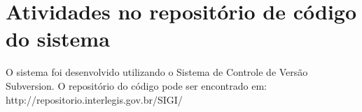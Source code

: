 %
%

\section{Atividades no repositório de código do sistema}
\label{sec:atividades}

O sistema foi desenvolvido utilizando o Sistema de Controle de Versão
Subversion. O repositório do código pode ser encontrado em:\\
http://repositorio.interlegis.gov.br/SIGI/

\footnotesize


%
%
